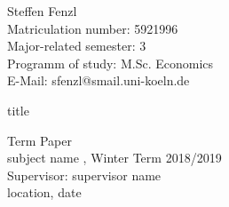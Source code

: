 \begin{titlepage}
\noindent
\large{Steffen Fenzl} \\
\large{Matriculation number: 5921996}\\
Major-related semester: 3 \\
Programm of study: M.Sc. Economics \\
E-Mail: sfenzl@smail.uni-koeln.de
 \vspace{\fill}
\begin{center}
\Huge{title}
\end{center}
\vspace{\fill}
\large{Term Paper} \\
subject name , Winter Term 2018/2019\\
Supervisor: supervisor name \\
location, date

\end{titlepage}
